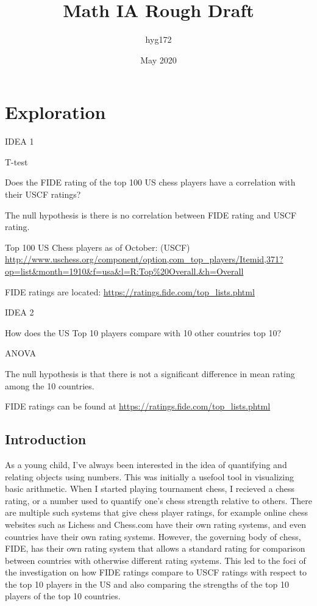 \documentclass[12pt]{article}
\title{Math IA Rough Draft}
\author{hyg172}
\date{May 2020}
\begin{document}
\maketitle

\tableofcontents
\newpage


\section{Exploration}
IDEA 1

T-test

Does the FIDE rating of the top 100 US chess players have a correlation with their USCF ratings?

The null hypothesis is there is no correlation between FIDE rating and USCF rating.

Top 100 US Chess players as of October: (USCF)
\url{http://www.uschess.org/component/option,com_top_players/Itemid,371?op=list&month=1910&f=usa&l=R:Top%20Overall.&h=Overall}

FIDE ratings are located:
\url{https://ratings.fide.com/top_lists.phtml}



IDEA 2

How does the US Top 10 players compare with 10 other countries top 10?

ANOVA

The null hypothesis is that there is not a significant difference in mean rating among the 10 countries.

FIDE ratings can be found at 
\url{https://ratings.fide.com/top_lists.phtml}

\subsection{Introduction}
As a young child, I've always been interested in the idea of quantifying and relating objects using numbers. This was initially a usefool tool in visualizing basic arithmetic. When I started playing tournament chess, I recieved a chess rating, or a number used to quantify one's chess strength relative to others. There are multiple such systems that give chess player ratings, for example online chess websites such as Lichess and Chess.com have their own rating systems, and even countries have their own rating systems. However, the governing body of chess, FIDE, has their own rating system that allows a standard rating for comparison between countries with otherwise different rating systems. This led to the foci of the investigation on how FIDE ratings compare to USCF ratings with respect to the top 10 players in the US and also comparing the strengths of the top 10 players of the top 10 countries.
\end{document}
